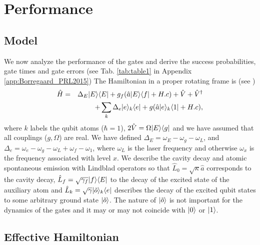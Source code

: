 \section{Performance}

\subsection{Model}
We now analyze the performance of the gates and derive the success
probabilities, gate times and gate errors (see Tab. \ref{tab:table1} in Appendix
\ref{app:Borregaard_PRL2015}) The Hamiltonian in a proper rotating frame is (see
)
\begin{eqnarray} 
\hat{H}&=&
\Delta_{E}| E \rangle
\langle E |+g_{f}(\hat{a}| E \rangle\langle f |+H.c)+\hat{V}+\hat{V}^{\dagger} \nonumber \\
&&+\sum_{k}\Delta_{e}| e \rangle_{k}\langle e |+g(\hat{a}| e \rangle_{k}\langle 1 |+H.c),
\end{eqnarray}          
where $k$ labels the qubit atoms ($\hbar=1$), $2\hat{V}=\Omega| E \rangle\langle g |$
and we have assumed that all couplings ($g,\Omega$) are real. We have defined
$\Delta_{E}=\omega_{E}-\omega_{g}-\omega_{L}$, and
$\Delta_{e}=\omega_{e}-\omega_{g}-\omega_{L}+\omega_{f}-\omega_{1}$, where
$\omega_{L}$ is the laser frequency and otherwise $\omega_{x}$ is the frequency
associated with level $x$. We describe the cavity decay and atomic spontaneous
emission with Lindblad operators so that $\hat{L}_{0}=\sqrt{\kappa}\hat{a}$
corresponds to the cavity decay,  $\hat{L}_{f}=\sqrt{\gamma_{f}}| f \rangle\langle E |$
to the decay of the excited state of the auxiliary atom and
$\hat{L}_{k}=\sqrt{\gamma}| \tilde{o} \rangle_{k}\langle e |$ describes the decay of the
excited qubit states to some arbitrary ground state $| \tilde{o} \rangle$. The
nature of $| \tilde{o} \rangle$ is not important for the dynamics of the gates and
it may or may not coincide with $| 0 \rangle$ or $| 1 \rangle$.

\subsection{Effective Hamiltonian}

